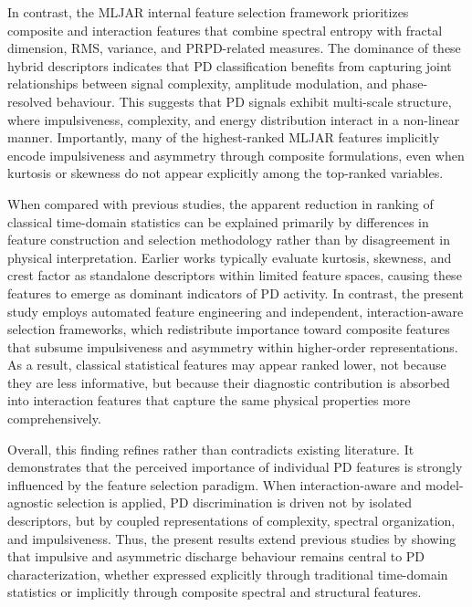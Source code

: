 In contrast, the MLJAR internal feature selection framework prioritizes composite and interaction features that combine spectral entropy with fractal dimension, RMS, variance, and PRPD-related measures. The dominance of these hybrid descriptors indicates that PD classification benefits from capturing joint relationships between signal complexity, amplitude modulation, and phase-resolved behaviour. This suggests that PD signals exhibit multi-scale structure, where impulsiveness, complexity, and energy distribution interact in a non-linear manner. Importantly, many of the highest-ranked MLJAR features implicitly encode impulsiveness and asymmetry through composite formulations, even when kurtosis or skewness do not appear explicitly among the top-ranked variables.

When compared with previous studies, the apparent reduction in ranking of classical time-domain statistics can be explained primarily by differences in feature construction and selection methodology rather than by disagreement in physical interpretation. Earlier works typically evaluate kurtosis, skewness, and crest factor as standalone descriptors within limited feature spaces, causing these features to emerge as dominant indicators of PD activity. In contrast, the present study employs automated feature engineering and independent, interaction-aware selection frameworks, which redistribute importance toward composite features that subsume impulsiveness and asymmetry within higher-order representations. As a result, classical statistical features may appear ranked lower, not because they are less informative, but because their diagnostic contribution is absorbed into interaction features that capture the same physical properties more comprehensively.

Overall, this finding refines rather than contradicts existing literature. It demonstrates that the perceived importance of individual PD features is strongly influenced by the feature selection paradigm. When interaction-aware and model-agnostic selection is applied, PD discrimination is driven not by isolated descriptors, but by coupled representations of complexity, spectral organization, and impulsiveness. Thus, the present results extend previous studies by showing that impulsive and asymmetric discharge behaviour remains central to PD characterization, whether expressed explicitly through traditional time-domain statistics or implicitly through composite spectral and structural features.



